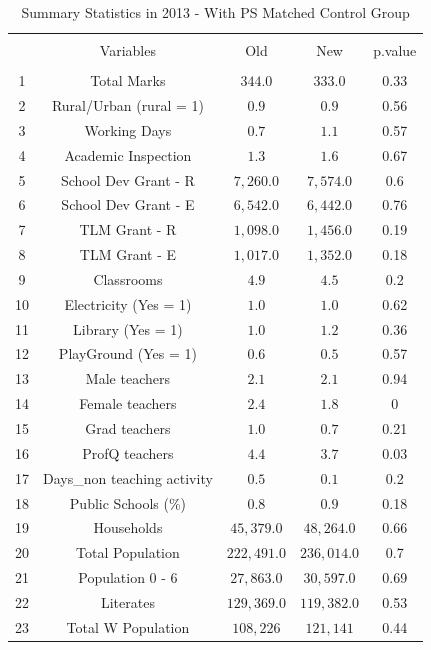 \documentclass[12pt, a4paper]{article}
\begin{document}
\begin{table}[!htbp] \centering 
  \caption{Summary Statistics in 2013 - With PS Matched Control Group} 
  \label{} 
\begin{tabular}{@{\extracolsep{5pt}} ccccc} 
\\[-1.8ex]\hline 
\hline \\[-1.8ex] 
 & Variables & Old & New & p.value \\ 
\hline \\[-1.8ex] 
1 & Total Marks & $344.0$ & $333.0$ & 0.33 \\ 
2 & Rural/Urban (rural = 1) & $0.9$ & $0.9$ & 0.56 \\ 
3 & Working Days & $0.7$ & $1.1$ & 0.57 \\ 
4 & Academic Inspection & $1.3$ & $1.6$ & 0.67 \\ 
5 & School Dev Grant - R & $7,260.0$ & $7,574.0$ & 0.6 \\ 
6 & School Dev Grant - E & $6,542.0$ & $6,442.0$ & 0.76 \\ 
7 & TLM Grant - R & $1,098.0$ & $1,456.0$ & 0.19 \\ 
8 & TLM Grant - E & $1,017.0$ & $1,352.0$ & 0.18 \\ 
9 & Classrooms & $4.9$ & $4.5$ & 0.2 \\ 
10 & Electricity (Yes = 1) & $1.0$ & $1.0$ & 0.62 \\ 
11 & Library  (Yes = 1) & $1.0$ & $1.2$ & 0.36 \\ 
12 & PlayGround  (Yes = 1) & $0.6$ & $0.5$ & 0.57 \\ 
13 & Male teachers & $2.1$ & $2.1$ & 0.94 \\ 
14 & Female teachers & $2.4$ & $1.8$ & 0 \\ 
15 & Grad teachers & $1.0$ & $0.7$ & 0.21 \\ 
16 & ProfQ teachers & $4.4$ & $3.7$ & 0.03 \\ 
17 & Days\_non teaching activity & $0.5$ & $0.1$ & 0.2 \\ 
18 & Public Schools (\%) & $0.8$ & $0.9$ & 0.18 \\ 
19 & Households & $45,379.0$ & $48,264.0$ & 0.66 \\ 
20 & Total Population & $222,491.0$ & $236,014.0$ & 0.7 \\ 
21 & Population 0 - 6 & $27,863.0$ & $30,597.0$ & 0.69 \\ 
22 & Literates & $129,369.0$ & $119,382.0$ & 0.53 \\ 
23 & Total W Population & $108,226$ & $121,141$ & 0.44 \\ 

\end{tabular}
\end{table}
\end{document}
